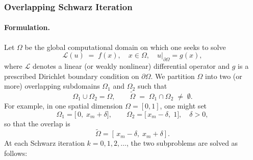 \documentclass[12pt]{article}
\begin{document}
\subsubsection{Overlapping Schwarz Iteration}

\paragraph{Formulation.}

Let \(\Omega\) be the global computational domain on which one seeks to solve
\begin{equation}
  \mathcal{L}(u) \;=\; f(x), 
  \quad x\in \Omega,\quad
  u|_{\partial\Omega} = g(x),
\end{equation}
where \(\mathcal{L}\) denotes a linear (or weakly nonlinear) differential operator and \(g\) is a prescribed Dirichlet boundary condition on \(\partial\Omega\).  We partition \(\Omega\) into two (or more) overlapping subdomains \(\Omega_1\) and \(\Omega_2\) such that
\begin{equation}
  \Omega_1 \cup \Omega_2 = \Omega, 
  \qquad
  \widetilde\Omega \;=\; \Omega_1 \cap \Omega_2 \;\neq\;\emptyset.
\end{equation}
For example, in one spatial dimension \(\Omega = [0,1]\), one might set
\begin{equation}
  \Omega_1 = \bigl[\,0,\;x_m + \delta\bigr], 
  \qquad
  \Omega_2 = \bigl[\,x_m - \delta,\;1\bigr],
  \quad \delta>0,
\end{equation}
so that the overlap is
\begin{equation}
  \widetilde\Omega = [\,x_m - \delta,\;x_m + \delta].
\end{equation}
At each Schwarz iteration \(k=0,1,2,\dots\), the two subproblems are solved as follows:
\end{document}
